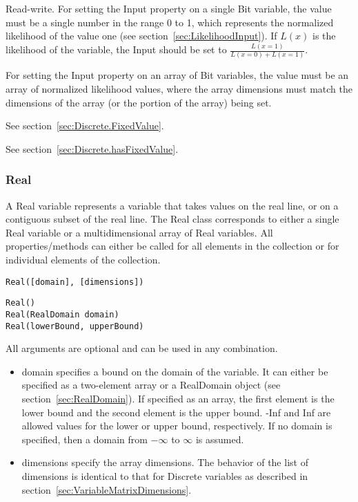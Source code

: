 Read-write.  For setting the Input property on a single Bit variable, the value must be a single number in the range 0 to 1, which represents the normalized likelihood of the value one (see section~\ref{sec:LikelihoodInput}).  If $L(x)$ is the likelihood of the variable, the Input should be set to $\frac{L(x=1)}{L(x=0) + L(x=1)}$.

For setting the Input property on an array of Bit variables, the value must be an array of normalized likelihood values, where the array dimensions must match the dimensions of the array (or the portion of the array) being set.



See section~\ref{sec:Discrete.FixedValue}.



See section~\ref{sec:Discrete.hasFixedValue}.


\subsubsection{Real}

A Real variable represents a variable that takes values on the real line, or on a contiguous subset of the real line.  \ifmatlab The Real class corresponds to either a single Real variable or a multidimensional array of Real variables.  All properties/methods can either be called for all elements in the collection or for individual elements of the collection.  \fi


\ifmatlab
\begin{lstlisting}
Real([domain], [dimensions])
\end{lstlisting}
\fi

\ifjava
\begin{lstlisting}
Real()
Real(RealDomain domain)
Real(lowerBound, upperBound)
\end{lstlisting}
\fi

\ifmatlab
All arguments are optional and can be used in any combination.

\begin{itemize}
\item domain specifies a bound on the domain of the variable. It can either be specified as a two-element array or a RealDomain object (see section~\ref{sec:RealDomain}).  If specified as an array, the first element is the lower bound and the second element is the upper bound. -Inf and Inf are allowed values for the lower or upper bound, respectively.  If no domain is specified, then a domain from $-\infty$ to $\infty$ is assumed.
\item dimensions specify the array dimensions.  The behavior of the list of dimensions is identical to that for Discrete variables as described in section~\ref{sec:VariableMatrixDimensions}.
\end{itemize}
\fi

